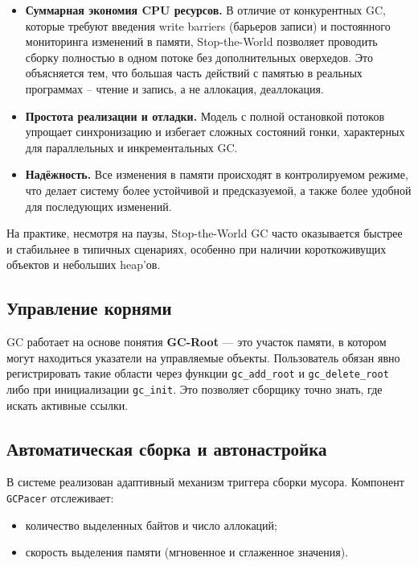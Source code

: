 \begin{itemize}
    \item \textbf{Суммарная экономия CPU ресурсов.} В отличие от конкурентных GC, которые требуют введения write barriers (барьеров записи) и постоянного мониторинга изменений в памяти, Stop-the-World позволяет проводить сборку полностью в одном потоке без дополнительных оверхедов. Это объясняется тем, что большая часть действий с памятью в реальных программах -- чтение и запись, а не аллокация, деаллокация.
    \item \textbf{Простота реализации и отладки.} Модель с полной остановкой потоков упрощает синхронизацию и избегает сложных состояний гонки, характерных для параллельных и инкрементальных GC.
    \item \textbf{Надёжность.} Все изменения в памяти происходят в контролируемом режиме, что делает систему более устойчивой и предсказуемой, а также более удобной для последующих изменений.
\end{itemize}

На практике, несмотря на паузы, Stop-the-World GC часто оказывается быстрее и стабильнее в типичных сценариях, особенно при наличии короткоживущих объектов и небольших heap'ов.

\subsection{Управление корнями}

GC работает на основе понятия \textbf{GC-Root} — это участок памяти, в котором могут находиться указатели на управляемые объекты. Пользователь обязан явно регистрировать такие области через функции \texttt{gc\_add\_root} и \texttt{gc\_delete\_root} либо при инициализации \texttt{gc\_init}. Это позволяет сборщику точно знать, где искать активные ссылки.

\subsection{Автоматическая сборка и автонастройка}

В системе реализован адаптивный механизм триггера сборки мусора. Компонент \\\texttt{GCPacer} отслеживает:
\begin{itemize}
    \item количество выделенных байтов и число аллокаций;
    \item скорость выделения памяти (мгновенное и сглаженное значения).
\end{itemize}


